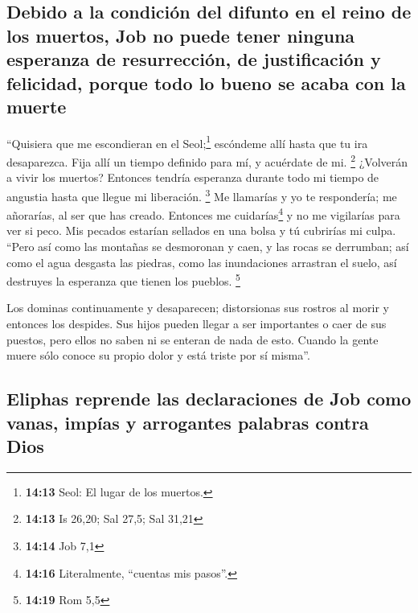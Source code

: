 \hypertarget{debido-a-la-condiciuxf3n-del-difunto-en-el-reino-de-los-muertos-job-no-puede-tener-ninguna-esperanza-de-resurrecciuxf3n-de-justificaciuxf3n-y-felicidad-porque-todo-lo-bueno-se-acaba-con-la-muerte}{%
\subsection{Debido a la condición del difunto en el reino de los
muertos, Job no puede tener ninguna esperanza de resurrección, de
justificación y felicidad, porque todo lo bueno se acaba con la
muerte}\label{debido-a-la-condiciuxf3n-del-difunto-en-el-reino-de-los-muertos-job-no-puede-tener-ninguna-esperanza-de-resurrecciuxf3n-de-justificaciuxf3n-y-felicidad-porque-todo-lo-bueno-se-acaba-con-la-muerte}}

 ``Quisiera que me escondieran en el Seol;\footnote{\textbf{14:13}
  Seol: El lugar de los muertos.} escóndeme allí hasta que tu ira
desaparezca. Fija allí un tiempo definido para mí, y acuérdate de mi.
\footnote{\textbf{14:13} Is 26,20; Sal 27,5; Sal 31,21} 
¿Volverán a vivir los muertos? Entonces tendría esperanza durante todo
mi tiempo de angustia hasta que llegue mi liberación. \footnote{\textbf{14:14}
  Job 7,1}  Me llamarías y yo te respondería; me
añorarías, al ser que has creado.  Entonces me
cuidarías\footnote{\textbf{14:16} Literalmente, ``cuentas mis pasos''.}
y no me vigilarías para ver si peco.  Mis pecados
estarían sellados en una bolsa y tú cubrirías mi culpa. 
``Pero así como las montañas se desmoronan y caen, y las rocas se
derrumban;  así como el agua desgasta las piedras, como
las inundaciones arrastran el suelo, así destruyes la esperanza que
tienen los pueblos. \footnote{\textbf{14:19} Rom 5,5}

 Los dominas continuamente y desaparecen; distorsionas
sus rostros al morir y entonces los despides.  Sus hijos
pueden llegar a ser importantes o caer de sus puestos, pero ellos no
saben ni se enteran de nada de esto.  Cuando la gente
muere sólo conoce su propio dolor y está triste por sí misma''.

\hypertarget{eliphas-reprende-las-declaraciones-de-job-como-vanas-impuxedas-y-arrogantes-palabras-contra-dios}{%
\subsection{Eliphas reprende las declaraciones de Job como vanas, impías
y arrogantes palabras contra
Dios}\label{eliphas-reprende-las-declaraciones-de-job-como-vanas-impuxedas-y-arrogantes-palabras-contra-dios}}

